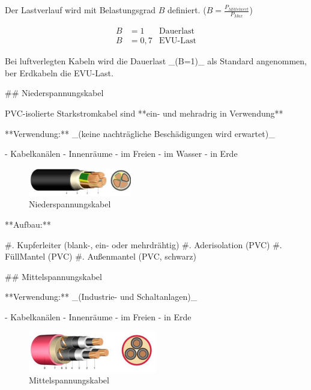 Der Lastverlauf wird mit Belastungsgrad $B$ definiert. ($B = \frac{P_{Mittelwert}}{P_{Max}}$)

\begin{align*}
    B &= 1   & \text{Dauerlast}\\
    B &= 0,7 & \text{EVU-Last} 
\end{align*}

\begin{markdown}

Bei luftverlegten Kabeln wird die Dauerlast _(B=1)_ als Standard angenommen, ber Erdkabeln die EVU-Last.

\newpage

## Niederspannungskabel

PVC-isolierte Starkstromkabel sind **ein- und mehradrig in Verwendung**

**Verwendung:** _(keine nachträgliche Beschädigungen wird erwartet)_

- Kabelkanälen
- Innenräume
- im Freien
- im Wasser
- in Erde

\begin{figure}
    \centering
    \includegraphics[width=0.4\textwidth]{./images/09-Kabel/Niederspannungskabel.png}
    \caption[Niederspannungskabel]{Niederspannungskabel}
\end{figure}

**Aufbau:**

#. Kupferleiter (blank-, ein- oder mehrdrähtig)
#. Aderisolation (PVC)
#. FüllMantel (PVC)
#. Außenmantel (PVC, schwarz)

## Mittelspannungskabel

**Verwendung:** _(Industrie- und Schaltanlagen)_

- Kabelkanälen
- Innenräume
- im Freien
- in Erde

\begin{figure}
    \centering
    \includegraphics[width=0.5\textwidth]{./images/09-Kabel/Mittelspannungskabel.png}
    \caption[Mittelspannungskabel]{Mittelspannungskabel}
\end{figure}


\end{markdown}
